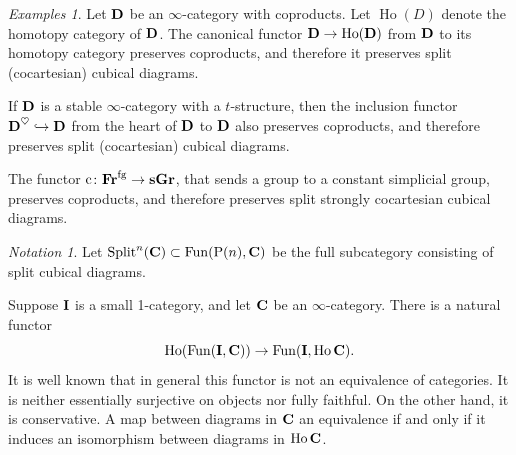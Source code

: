 \documentclass[psamsfonts]{amsart}
\theoremstyle{plain}
\theoremstyle{definition}
\theoremstyle{remark}
\newtheorem{exmps}[thm]{Examples}
\newtheorem{notn}[thm]{Notation}
\newcommand{\catname}[1]{{\normalfont\textbf{#1}}}
\newcommand{\fr}{\allfr^{\mathrm{fg}}}
\newcommand{\allfr}{\catname{Fr}}
\newcommand{\sgr}{\catname{sGr}}
\newcommand{\const}{\mathrm{c}}
\newcommand{\power}{\mathrm{P}}
\DeclareMathOperator{\fun}{Fun}
\DeclareMathOperator{\splitcube}{Split}
\newcommand{\cocartesiansplit}[1]{\splitcube^{\fbox{$#1$}}}
\DeclareMathOperator{\ho}{Ho}
\begin{document}
\begin{exmps}\label{example: preserves} Let $\catname{D}$ be an $\infty$-category with coproducts. Let $\ho(D)$ denote the homotopy category of $\catname{D}$. The canonical functor $\catname{D} \to \ho(\catname{D})$ from $\catname{D}$ to its homotopy category preserves coproducts, and therefore it preserves split (cocartesian) cubical diagrams. 

If $\catname{D}$ is a stable $\infty$-category with a $t$-structure, then the inclusion functor $\catname{D}^{\heartsuit}\hookrightarrow \catname{D}$ from the heart of $\catname{D}$ to $\catname{D}$ also preserves coproducts, and therefore preserves split (cocartesian) cubical diagrams.

The functor $\const\colon\fr\to \sgr$, that sends a group to a constant simplicial group, preserves coproducts, and therefore preserves split strongly cocartesian cubical diagrams.
\end{exmps}  
\begin{notn}
Let $\splitcube^n(\catname{C}) \subset \fun(\power(n), \catname{C})$ be the full subcategory consisting of split cubical diagrams. %
\end{notn}
Suppose $\catname{I}$ is a small 1-category, and let $\catname{C}$ be an $\infty$-category. There is a natural functor 
\begin{equation}\label{eq:hofunctor}
\ho(\fun(\catname{I}, \catname{C}))\to \fun(\catname{I}, \ho\catname{C}).
\end{equation}
It is well known that in general this functor is not an equivalence of categories. It is neither essentially surjective on objects nor fully faithful. On the other hand, it is conservative. A map between diagrams in $\catname{C}$ an equivalence if and only if it induces an isomorphism between diagrams in $\ho\catname{C}$. 
\end{document}
